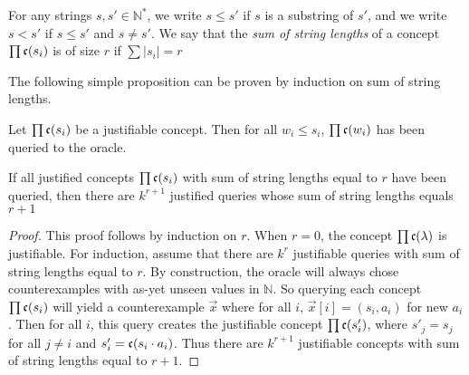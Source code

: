 \documentclass[11pt]{amsart}
\begin{document}
For any strings $s,s' \in \mathbb{N}^*$, we write $s \le s'$ if $s$ is a substring of $s'$, and we write $s < s'$ if $s \le s'$ and $s \ne s'$.
We say that the \emph{sum of string lengths} of a concept $\prod \mathfrak{c}(s_i)$ is of size $r$ if $\sum |s_i| = r$

The following simple proposition can be proven by induction on sum of string lengths.

\begin{proposition}
\label{subjust}
Let $\prod \mathfrak{c}(s_i)$ be a justifiable concept. 
Then for all $w_i \le s_i$, $\prod \mathfrak{c}(w_i)$ has been queried to the oracle.
\end{proposition}

\begin{proposition}
\label{numjustconc}
If all justified concepts $\prod \mathfrak{c}(s_i)$ with sum of string lengths equal to $r$ have been queried, then there are $k^{r+1}$ justified queries whose sum of string lengths equals $r+1$
\end{proposition}
\begin{proof}
This proof follows by induction on $r$. 
When $r=0$, the concept $\prod \mathfrak{c}(\lambda)$ is justifiable.%
For induction, assume that there are $k^r$ justifiable queries with sum of string lengths equal to $r$. 
By construction, the oracle will always chose counterexamples with as-yet unseen values in $\mathbb{N}$. 
So querying each concept $\prod \mathfrak{c}(s_i)$ will yield a counterexample $\vec{x}$ where for all $i$, $\vec{x}[i] = (s_i, a_i)$ for new $a_i$.
Then for all $i$, this query creates the justifiable concept $\prod \mathfrak{c}(s'_i)$, where $s'_j = s_j$ for all $j \ne i$ and $s'_i = \mathfrak{c}(s_i \cdot a_i)$.
Thus there are $k^{r+1}$ justifiable concepts with sum of string lengths equal to $r+1$.
\end{proof}
\end{document}
